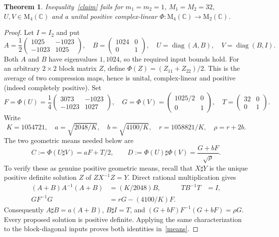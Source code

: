 \documentclass[11pt]{article}
\newtheorem{theorem}{Theorem}
\newcommand{\M}{\mathrm{M}}
\begin{document}
\begin{theorem}\label{counter}
Inequality~\eqref{claim} fails for $m_1=m_2=1$, $M_1=M_2=32$,
$U,V\in\M_4(\mathbb C)$ and a unital positive complex-linear
$\Phi:\M_4(\mathbb C)\to\M_2(\mathbb C)$.
\end{theorem}
\begin{proof}
Let $I=I_2$ and put
\[
 A=\frac12\begin{pmatrix}1025&-1023\\-1023&1025\end{pmatrix},\quad
 B=\begin{pmatrix}1024&0\\0&1\end{pmatrix},\quad
 U=\operatorname{diag}(A,B),\quad V=\operatorname{diag}(B,I).
\]
Both $A$ and $B$ have eigenvalues $1,1024$, so the required input bounds hold.
For an arbitrary $2\times2$ block matrix $Z$, define
$\Phi(Z)=(Z_{11}+Z_{22})/2$. This is the average of two compression maps,
hence is unital, complex-linear and positive (indeed completely positive).
Set
\[
 F=\Phi(U)=\frac14\begin{pmatrix}3073&-1023\\-1023&1027\end{pmatrix},\quad
 G=\Phi(V)=\begin{pmatrix}1025/2&0\\0&1\end{pmatrix},\quad
 T=\begin{pmatrix}32&0\\0&1\end{pmatrix}.
\]
Write
\begin{equation}\label{radicals}
 K=1054721,\quad a=\sqrt{2048/K},\quad b=\sqrt{4100/K},\quad
 r=1058821/K,\quad \rho=r+2b.
\end{equation}
The two geometric means needed below are
\begin{equation}\label{means}
 C:=\Phi(U\sharp V)=aF+T/2,\qquad
 D:=\Phi(U)\sharp\Phi(V)=\frac{G+bF}{\sqrt\rho}.
\end{equation}
To verify these as genuine positive geometric means, recall that $X\sharp Y$
is the unique positive definite solution $Z$ of $ZX^{-1}Z=Y$.
Direct rational multiplication gives
\begin{align*}
 (A+B)A^{-1}(A+B)&=(K/2048)B,& T B^{-1}T&=I,\\
 GF^{-1}G&=rG-(4100/K)F.
\end{align*}
Consequently $A\sharp B=a(A+B)$, $B\sharp I=T$, and
$(G+bF)F^{-1}(G+bF)=\rho G$. Every proposed solution is positive
definite. Applying the same characterization to the block-diagonal inputs
proves both identities in~\eqref{means}.


\end{proof}
\end{document}
